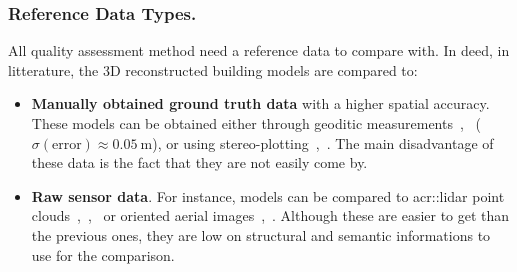 \documentclass[runningheads]{llncs}
\begin{document}
\subsubsection{Reference Data Types.}
All quality assessment method need a reference data to compare with. In deed, in litterature, the 3D reconstructed building models are compared to:
\begin{itemize}
	\item \textbf{Manually obtained ground truth data} with a higher spatial accuracy. These models can be obtained either through geoditic measurements~\cite{Kaartinen2005},~\cite{Voegtle2003} ($\sigma(\text{error}) \approx \SI{0.05}{\meter}$), or using stereo-plotting~\cite{Kaartinen2005},~\cite{Zeng2014}. The main disadvantage of these data is the fact that they are not easily come by.
	\item \textbf{Raw sensor data}. For instance, models can be compared to \acrfull{acr::lidar} point clouds~\cite{Akca2010},~\cite{Lafarge2012},~\cite{li2016boxfitting} or oriented aerial images~\cite{boudet2006supervised},~\cite{Michelin2013}. Although these are easier to get than the previous ones, they are low on structural and semantic informations to use for the comparison.
\end{itemize}
\end{document}
